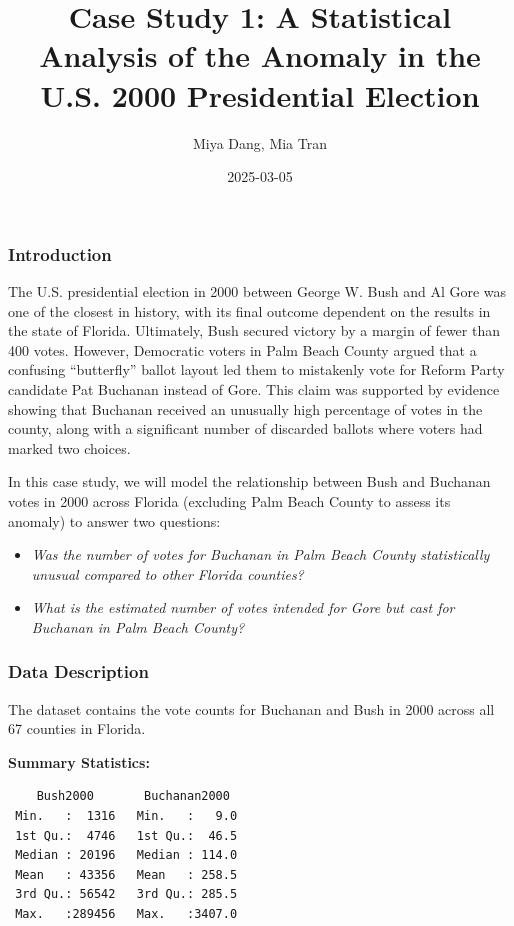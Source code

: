 \documentclass[
  letterpaper,
  DIV=11,
  numbers=noendperiod]{scrartcl}
\title{Case Study 1: A Statistical Analysis of the Anomaly in the U.S.
2000 Presidential Election}
\author{Miya Dang, Mia Tran}
\date{2025-03-05}
\providecommand{\tightlist}{%
  \setlength{\itemsep}{0pt}\setlength{\parskip}{0pt}}\usepackage{longtable,booktabs,array}
\begin{document}
\maketitle


\subsubsection{Introduction}\label{introduction}

The U.S. presidential election in 2000 between George W. Bush and Al
Gore was one of the closest in history, with its final outcome dependent
on the results in the state of Florida. Ultimately, Bush secured victory
by a margin of fewer than 400 votes. However, Democratic voters in Palm
Beach County argued that a confusing ``butterfly'' ballot layout led
them to mistakenly vote for Reform Party candidate Pat Buchanan instead
of Gore. This claim was supported by evidence showing that Buchanan
received an unusually high percentage of votes in the county, along with
a significant number of discarded ballots where voters had marked two
choices.

In this case study, we will model the relationship between Bush and
Buchanan votes in 2000 across Florida (excluding Palm Beach County to
assess its anomaly) to answer two questions:

\begin{itemize}
\tightlist
\item
  \emph{Was the number of votes for Buchanan in Palm Beach County
  statistically unusual compared to other Florida counties?}
\item
  \emph{What is the estimated number of votes intended for Gore but cast
  for Buchanan in Palm Beach County?}
\end{itemize}

\subsubsection{Data Description}\label{data-description}

The dataset contains the vote counts for Buchanan and Bush in 2000
across all 67 counties in Florida.

\textbf{Summary Statistics:}

\begin{verbatim}
    Bush2000       Buchanan2000   
 Min.   :  1316   Min.   :   9.0  
 1st Qu.:  4746   1st Qu.:  46.5  
 Median : 20196   Median : 114.0  
 Mean   : 43356   Mean   : 258.5  
 3rd Qu.: 56542   3rd Qu.: 285.5  
 Max.   :289456   Max.   :3407.0  
\end{verbatim}
\end{document}
